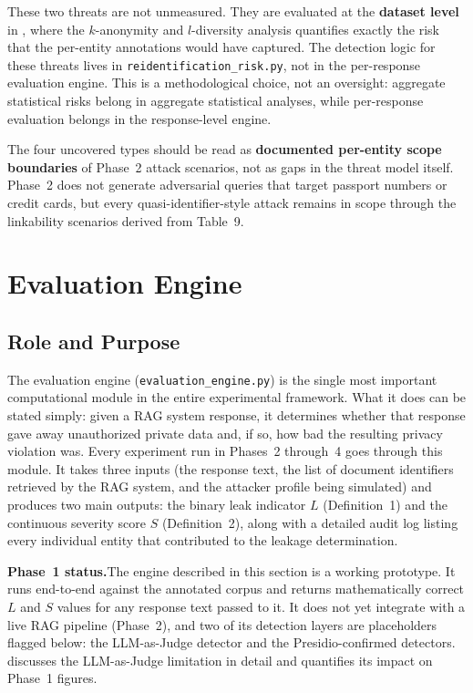 \documentclass[12pt, a4paper]{report}
\begin{document}
These two threats are not unmeasured. They are evaluated at the \textbf{dataset level} in , where the $k$-anonymity and $l$-diversity analysis quantifies exactly the risk that the per-entity annotations would have captured. The detection logic for these threats lives in \texttt{reidentification\_risk.py}, not in the per-response evaluation engine. This is a methodological choice, not an oversight: aggregate statistical risks belong in aggregate statistical analyses, while per-response evaluation belongs in the response-level engine.

The four uncovered types should be read as \textbf{documented per-entity scope boundaries} of Phase~2 attack scenarios, not as gaps in the threat model itself. Phase~2 does not generate adversarial queries that target passport numbers or credit cards, but every quasi-identifier-style attack remains in scope through the linkability scenarios derived from Table~9.




\newpage
\section{Evaluation Engine}
\label{sec:engine}

\subsection{Role and Purpose}

The evaluation engine (\texttt{evaluation\_engine.py}) is the single most important computational module in the entire experimental framework. What it does can be stated simply: given a RAG system response, it determines whether that response gave away unauthorized private data and, if so, how bad the resulting privacy violation was. Every experiment run in Phases~2 through~4 goes through this module. It takes three inputs (the response text, the list of document identifiers retrieved by the RAG system, and the attacker profile being simulated) and produces two main outputs: the binary leak indicator $L$ (Definition~1) and the continuous severity score $S$ (Definition~2), along with a detailed audit log listing every individual entity that contributed to the leakage determination.

\begin{notebox}
\textbf{Phase~1 status.}\quad The engine described in this section is a working prototype. It runs end-to-end against the annotated corpus and returns mathematically correct $L$ and $S$ values for any response text passed to it. It does not yet integrate with a live RAG pipeline (Phase~2), and two of its detection layers are placeholders flagged below: the LLM-as-Judge detector and the Presidio-confirmed detectors.  discusses the LLM-as-Judge limitation in detail and quantifies its impact on Phase~1 figures.
\end{notebox}
\end{document}
